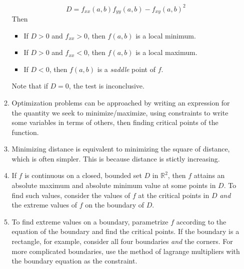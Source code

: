 \documentclass[10pt]{article}
\begin{document}
\begin{multicols*}{2}
\begin{enumerate}
\begin{enumerate}
        $$D = f_{xx}(a,b)f_{yy}(a,b) - f_{xy}(a,b)^2$$
        Then
        \begin{itemize}
            \item If $D > 0$ and $f_{xx} > 0$, then $f(a,b)$ is a local minimum.
            \item If $D > 0$ and $f_{xx} < 0$, then $f(a,b)$ is a local maximum.
            \item If $D < 0$, then $f(a,b)$ is a \textit{saddle} point of $f$.
        \end{itemize}
        Note that if $D = 0$, the test is inconclusive.
        \item Optimization problems can be approached by writing an expression for the quantity we seek to minimize/maximize, using constraints to write some variables in terms of others, then finding critical points of the function.
        \item Minimizing distance is equivalent to minimizing the square of distance, which is often simpler. This is because distance is stictly increasing.
        \item If $f$ is continuous on a closed, bounded set $D$ in $\mathbb{R}^2$, then $f$ attains an absolute maximum and absolute minimum value at some points in $D$. To find such values, consider the values of $f$ at the critical points in $D$ \textit{and} the extreme values of $f$ on the boundary of $D$.
        \item To find extreme values on a boundary, parametrize $f$ according to the equation of the boundary and find the critical points. If the boundary is a rectangle, for example, consider all four boundaries \textit{and} the corners. For more complicated boundaries, use the method of lagrange multipliers with the boundary equation as the constraint.
    
    \end{enumerate}
    

\end{enumerate}
\end{multicols*}
\end{document}
